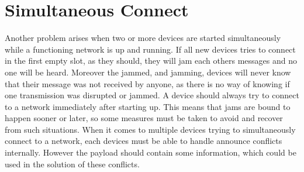 \clearpage
\section{Simultaneous Connect} %
\label{sec:simultaneous_connect}

Another problem arises when two or more devices are started simultaneously while a functioning network is up and running.
If all new devices tries to connect in the first empty slot, as they should, they will jam each others messages and no one will be heard.
Moreover the jammed, and jamming, devices will never know that their message was not received by anyone, as there is no way of knowing if one transmission was disrupted or jammed.
A device should always try to connect to a network immediately after starting up.
This means that jams are bound to happen sooner or later, so some measures must be taken to avoid and recover from such situations.
When it comes to multiple devices trying to simultaneously connect to a network, each devices must be able to handle announce conflicts internally.
However the payload should contain some information, which could be used in the solution of these conflicts.

